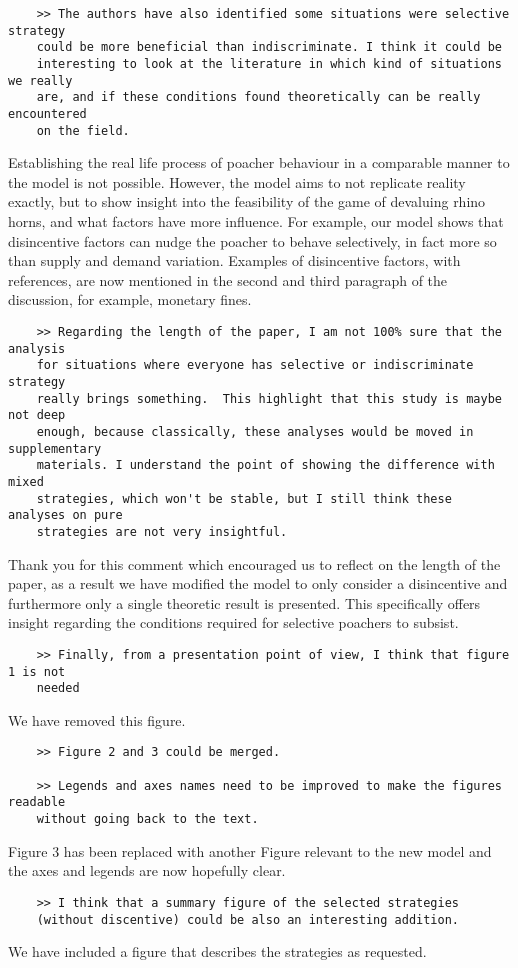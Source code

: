\documentclass[10pt]{article}
\begin{document}
\begin{verbatim}
    >> The authors have also identified some situations were selective strategy
    could be more beneficial than indiscriminate. I think it could be
    interesting to look at the literature in which kind of situations we really
    are, and if these conditions found theoretically can be really encountered
    on the field.
\end{verbatim}

Establishing the real life process of poacher behaviour in a comparable manner to the
model is not possible. However, the model aims to not replicate reality exactly, but
to show insight into the feasibility of the game of devaluing rhino horns, and what
factors have more influence. For example, our model shows that disincentive factors
can nudge the poacher to behave selectively, in fact more so than supply and demand
variation. Examples of disincentive factors, with references, are now mentioned in
the second and third paragraph of the discussion, for example, monetary fines.


\begin{verbatim}
    >> Regarding the length of the paper, I am not 100% sure that the analysis
    for situations where everyone has selective or indiscriminate strategy
    really brings something.  This highlight that this study is maybe not deep
    enough, because classically, these analyses would be moved in supplementary
    materials. I understand the point of showing the difference with mixed
    strategies, which won't be stable, but I still think these analyses on pure
    strategies are not very insightful.
\end{verbatim}

Thank you for this comment which encouraged us to reflect on the length of the
paper, as a result we have modified the model to only consider a disincentive
and furthermore only a single theoretic result is presented. This specifically
offers insight regarding the conditions required for selective poachers to
subsist.

\begin{verbatim}
    >> Finally, from a presentation point of view, I think that figure 1 is not
    needed
\end{verbatim}

We have removed this figure.

\begin{verbatim}
    >> Figure 2 and 3 could be merged.

    >> Legends and axes names need to be improved to make the figures readable
    without going back to the text.
\end{verbatim}

Figure 3 has been replaced with another Figure relevant to the new model and the
axes and legends are now hopefully clear.

\begin{verbatim}
    >> I think that a summary figure of the selected strategies
    (without discentive) could be also an interesting addition.
\end{verbatim}

We have included a figure that describes the strategies as requested.
\end{document}
